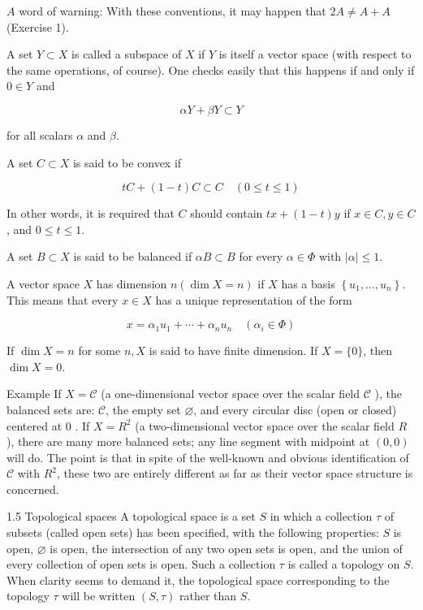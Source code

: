 \documentclass[10pt]{article}
\begin{document}
$A$ word of warning: With these conventions, it may happen that $2 A \neq A+A$ (Exercise 1).

A set $Y \subset X$ is called a subspace of $X$ if $Y$ is itself a vector space (with respect to the same operations, of course). One checks easily that this happens if and only if $0 \in Y$ and

$$
\alpha Y+\beta Y \subset Y
$$

for all scalars $\alpha$ and $\beta$.

A set $C \subset X$ is said to be convex if

$$
t C+(1-t) C \subset C \quad(0 \leq t \leq 1)
$$

In other words, it is required that $C$ should contain $t x+(1-t) y$ if $x \in C, y \in C$, and $0 \leq t \leq 1$.

A set $B \subset X$ is said to be balanced if $\alpha B \subset B$ for every $\alpha \in \Phi$ with $|\alpha| \leq 1$.

A vector space $X$ has dimension $n(\operatorname{dim} X=n)$ if $X$ has a basis $\left\{u_{1}, \ldots, u_{n}\right\}$. This means that every $x \in X$ has a unique representation of the form

$$
x=\alpha_{1} u_{1}+\cdots+\alpha_{n} u_{n} \quad\left(\alpha_{i} \in \Phi\right)
$$

If $\operatorname{dim} X=n$ for some $n, X$ is said to have finite dimension. If $X=\{0\}$, then $\operatorname{dim} X=0$.

Example If $X=\mathscr{C}$ (a one-dimensional vector space over the scalar field $\mathscr{C}$ ), the balanced sets are: $\mathscr{C}$, the empty set $\varnothing$, and every circular disc (open or closed) centered at 0 . If $X=R^{2}$ (a two-dimensional vector space over the scalar field $R$ ), there are many more balanced sets; any line segment with midpoint at $(0,0)$ will do. The point is that in spite of the well-known and obvious identification of $\mathscr{C}$ with $R^{2}$, these two are entirely different as far as their vector space structure is concerned.

1.5 Topological spaces A topological space is a set $S$ in which a collection $\tau$ of subsets (called open sets) has been specified, with the following properties: $S$ is open, $\varnothing$ is open, the intersection of any two open sets is open, and the union of every collection of open sets is open. Such a collection $\tau$ is called a topology on $S$. When clarity seems to demand it, the topological space corresponding to the topology $\tau$ will be written $(S, \tau)$ rather than $S$.
\end{document}
